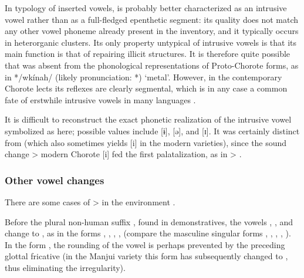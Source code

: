 In  typology of inserted vowels,  is probably better characterized as an intrusive vowel rather than as a full-fledged epenthetic segment: its quality does not match any other vowel phoneme already present in the inventory, and it typically occurs in heterorganic clusters. Its only property untypical of intrusive vowels is that its main function is that of repairing illicit structures. It is therefore quite possible that  was absent from the phonological representations of Proto-Chorote forms, as in */wkínah/ (likely pronunciation: *) `metal'. However, in the contemporary Chorote lects its reflexes are clearly segmental, which is in any case a common fate of erstwhile intrusive vowels in many languages \citep[422–424]{NH06}. 

It is difficult to reconstruct the exact phonetic realization of the intrusive vowel symbolized as  here; possible values include [ɨ], [ə], and [ɪ]. It was certainly distinct from  (which also sometimes yields [i] in the modern varieties), since the sound change  > modern Chorote [i] fed the first palatalization, as in  > .

\subsubsection{Other vowel changes} \label{pm-ch-vowel-resid}

There are some cases of  >  in the environment . 

\begin{exe}
    \ex \heel
    \ex \face
    \ex \eyebrow
\end{exe}

Before the plural non-human suffix , found in demonstratives, the vowels , , and  change to , as in the forms , , , ,  (compare the masculine singular forms , , , , ). In the form , the rounding of the vowel is perhaps prevented by the preceding glottal fricative (in the Manjui variety this form has subsequently changed to , thus eliminating the irregularity).


